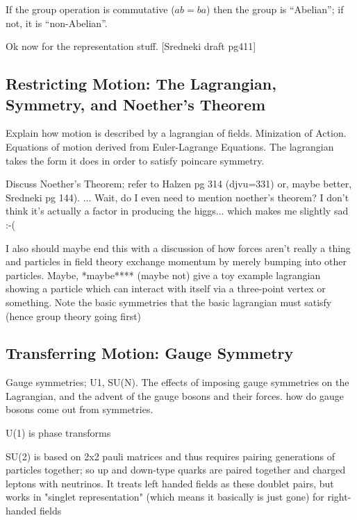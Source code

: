         If the group operation is commutative ($ab=ba$) then the group is ``Abelian''; if not, it is ``non-Abelian''.

        Ok now for the representation stuff. [Sredneki draft pg411]

        \cite{Cheng_book}

    \subsection{Restricting Motion: The Lagrangian, Symmetry, and Noether's Theorem}

        Explain how motion is described by a lagrangian of fields. 
        Minization of Action.
        Equations of motion derived from Euler-Lagrange Equations.
        The lagrangian takes the form it does in order to satisfy poincare symmetry.

        Discuss Noether's Theorem; refer to Halzen pg 314 (djvu=331) or, maybe better, Sredneki pg 144).
            ... Wait, do I even need to mention noether's theorem?
            I don't think it's actually a factor in producing the higgs... which makes me slightly sad :-(

        I also should maybe end this with a discussion of how forces aren't really a thing
            and particles in field theory exchange momentum by merely bumping into other particles.
        Maybe, *maybe**** (maybe not) give a toy example lagrangian showing a particle which can interact with itself via a three-point vertex or something.
        Note the basic symmetries that the basic lagrangian must satisfy (hence group theory going first)
        \cite{Halzen_book}


    \subsection{Transferring Motion: Gauge Symmetry}

        Gauge symmetries; U1, SU(N).
        The effects of imposing gauge symmetries on the Lagrangian, and the advent of the gauge bosons and their forces.
        how do gauge bosons come out from symmetries.

        U(1) is phase transforms

        SU(2) is based on 2x2 pauli matrices and thus requires pairing generations of particles together;
            so up and down-type quarks are paired together and charged leptons with neutrinos.
        It treats left handed fields as these doublet pairs,
            but works in "singlet representation" (which means it basically is just gone) for right-handed fields

